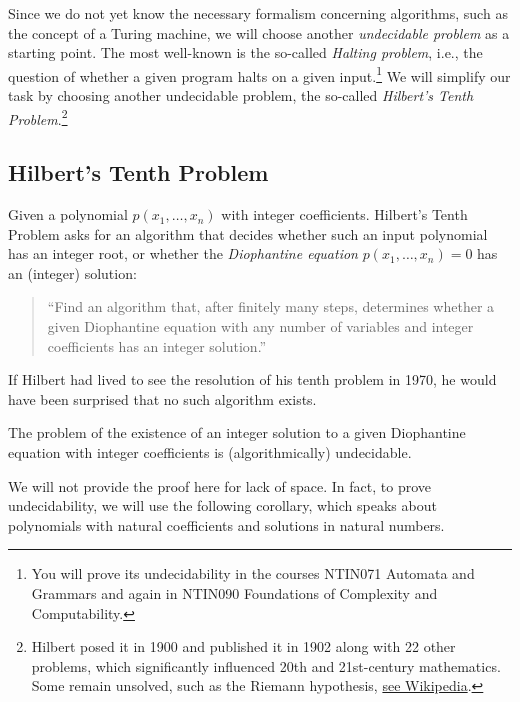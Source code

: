     Since we do not yet know the necessary formalism concerning algorithms, such as the concept of a Turing machine, we will choose another \emph{undecidable problem} as a starting point. The most well-known is the so-called \emph{Halting problem}, i.e., the question of whether a given program halts on a given input.\footnote{You will prove its undecidability in the courses NTIN071 Automata and Grammars and again in NTIN090 Foundations of Complexity and Computability.} We will simplify our task by choosing another undecidable problem, the so-called \emph{Hilbert's Tenth Problem}.\footnote{Hilbert posed it in 1900 and published it in 1902 along with 22 other problems, which significantly influenced 20th and 21st-century mathematics. Some remain unsolved, such as the Riemann hypothesis, \href{https://en.wikipedia.org/wiki/Riemann_hypothesis}{see Wikipedia}.}
    
    \subsection{Hilbert's Tenth Problem}
    
    Given a polynomial $p(x_1,\dots,x_n)$ with integer coefficients. Hilbert's Tenth Problem asks for an algorithm that decides whether such an input polynomial has an integer root, or whether the \emph{Diophantine equation} $p(x_1,\dots,x_n)=0$ has an (integer) solution:
    \begin{quote}
        ``Find an algorithm that, after finitely many steps, determines whether a given Diophantine equation with any number of variables and integer coefficients has an integer solution.''
    \end{quote}
    
    If Hilbert had lived to see the resolution of his tenth problem in 1970, he would have been surprised that no such algorithm exists.
    
    \begin{theorem}
    The problem of the existence of an integer solution to a given Diophantine equation with integer coefficients is (algorithmically) undecidable.
    \end{theorem}
    
    We will not provide the proof here for lack of space. In fact, to prove undecidability, we will use the following corollary, which speaks about polynomials with natural coefficients and solutions in natural numbers.
    

